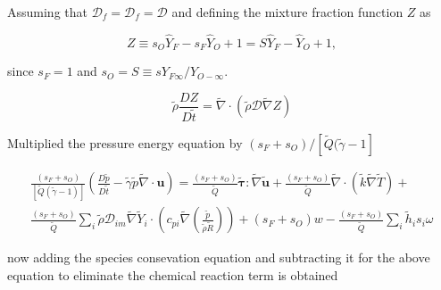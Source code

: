 \documentclass[preprint,12pt,authoryear]{elsarticle}
\begin{document}
Assuming that $\mathcal{D}_f=\mathcal{D}_f=\mathcal{D}$ and 
defining the mixture fraction function $Z$ as 

\begin{equation}
Z 
\equiv 
s_O\hat{Y}_F 
- 
s_F \hat{Y}_O 
+ 1 
= 
S\hat{Y}_F 
- 
\hat{Y}_O 
+ 
1,
\end{equation}

since $s_F=1$ and $s_O= S \equiv s Y_{F\infty}/Y_{O-\infty}$.
%

\begin{equation}
	\tilde{\rho} \frac{D Z }{D \tilde{t}}
= 
	\tilde{\nabla}
	\cdot
	\left(
		\tilde{\rho} \mathcal{D} \tilde{\nabla} Z 
	\right)  
\end{equation}

Multiplied the pressure energy equation by 
$(s_F+s_O)/[\tilde{Q}(\tilde{\gamma}-1]$

\begin{equation}
\begin{split}
	\frac{(s_F+s_O)}{[\tilde{Q}(\tilde{\gamma}-1)]}
	\left(
        	\frac{D \tilde{p}}{D\tilde{t}}
		-
		\tilde{\gamma}
		\tilde{p} 
		\tilde{\nabla}\cdot{\mathbf{u}}
	\right)
        =
	\frac{(s_F+s_O)}{\tilde{Q}}
        \pmb{\tilde{\tau}}:\tilde{\nabla} \tilde{\mathbf{u}} 
        + 
	\frac{(s_F+s_O)}{\tilde{Q}}
        \tilde{\nabla} \cdot (\tilde{k}\tilde{\nabla} \tilde{T})
        +
	\\
	\frac{(s_F+s_O)}{\tilde{Q}}
        \sum\limits_i 
        \tilde{\rho}
        \mathcal{D}_{im}
        \tilde{\nabla}
        \tilde{Y}_i     
        \cdot
        \left(
                c_{pi}
                \tilde{\nabla}
                \left(
                	\frac{\tilde{p}}{\tilde{\rho}\tilde{R}}
                \right)
        \right)
	+
	(s_F+s_O)w
	-
	\frac{(s_F+s_O)}{\tilde{Q}}
        \sum\limits_i
	\tilde{h}_i
        s_i \omega	
\end{split}
\end{equation}

now adding the species consevation equation and subtracting it for the above equation to 
eliminate the chemical reaction term is obtained  
\end{document}
